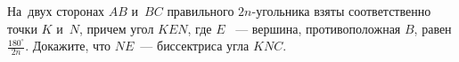 \begin{problems}
\item
На~двух сторонах $AB$ и~$BC$ правильного $2n$-угольника взяты соответственно
точки $K$ и~$N$, причем угол $KEN$, где $E$ ~--- вершина, противоположная $B$,
равен $\frac{180^{\circ}}{2n}$.
Докажите, что $NE$~--- биссектриса угла $KNC$.



\end{problems}

